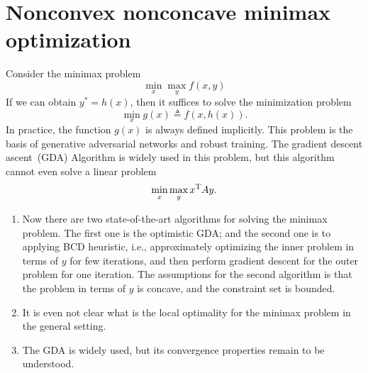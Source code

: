 \section{Nonconvex nonconcave minimax optimization}
Consider the minimax problem
\[
\min_x\max_yf(x,y)
\]
If we can obtain $y^*=h(x)$, then it suffices to solve the minimization problem
\[
\min_xg(x)\triangleq f(x,h(x)).
\]
In practice, the function $g(x)$ is always defined implicitly.
This problem is the basis of generative adversarial networks and robust training.
The gradient descent ascent~(GDA) Algorithm is widely used in this problem, but this algorithm cannot even solve a linear problem
\[
\min_x\max_y x^{\mathrm T} Ay.
\]
\begin{remark}
\begin{enumerate}
\item
Now there are two state-of-the-art algorithms for solving the minimax problem. The first one is the optimistic GDA; and the second one is to applying BCD heuristic, i.e., approximately optimizing the inner problem in terms of $y$ for few iterations, and then perform gradient descent for the outer problem for one iteration.
The assumptions for the second algorithm is that the problem in terms of $y$ is concave, and the constraint set is bounded.
\item
It is even not clear what is the local optimality for the minimax problem in the general setting.
\item
The GDA is widely used, but its convergence properties remain to be understood.
\end{enumerate}
\end{remark}

